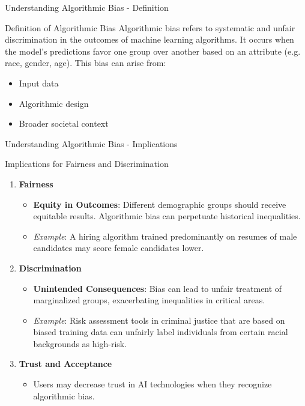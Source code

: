 \documentclass[aspectratio=169]{beamer}
\begin{document}
\begin{frame}[fragile]{Understanding Algorithmic Bias - Definition}
  \begin{block}{Definition of Algorithmic Bias}
    Algorithmic bias refers to systematic and unfair discrimination in the outcomes of machine learning algorithms. It occurs when the model's predictions favor one group over another based on an attribute (e.g. race, gender, age). This bias can arise from:
    \begin{itemize}
      \item Input data
      \item Algorithmic design
      \item Broader societal context
    \end{itemize}
  \end{block}
\end{frame}

\begin{frame}[fragile]{Understanding Algorithmic Bias - Implications}
  \begin{block}{Implications for Fairness and Discrimination}
    \begin{enumerate}
      \item \textbf{Fairness}
      \begin{itemize}
        \item \textbf{Equity in Outcomes}: Different demographic groups should receive equitable results. Algorithmic bias can perpetuate historical inequalities.
        \item \textit{Example}: A hiring algorithm trained predominantly on resumes of male candidates may score female candidates lower.
      \end{itemize}
      
      \item \textbf{Discrimination}
      \begin{itemize}
        \item \textbf{Unintended Consequences}: Bias can lead to unfair treatment of marginalized groups, exacerbating inequalities in critical areas.
        \item \textit{Example}: Risk assessment tools in criminal justice that are based on biased training data can unfairly label individuals from certain racial backgrounds as high-risk.
      \end{itemize}
      
      \item \textbf{Trust and Acceptance}
      \begin{itemize}
        \item Users may decrease trust in AI technologies when they recognize algorithmic bias.
      \end{itemize}
    \end{enumerate}
  \end{block}
\end{frame}
\end{document}
